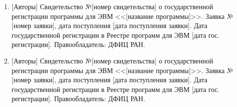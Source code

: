 \begin{enumerate}

    \item
    {[Авторы]} Свидетельство №[номер свидетельства] о государственной регистрации программы для ЭВМ <<[название программы]>>. Заявка №[номер заявки], дата поступления [дата поступления заявки]. Дата государственной регистрации в Реестре программ для ЭВМ [дата гос. регистрации]. Правообладатель: ДФИЦ РАН.

    \item
    {[Авторы]} Свидетельство №[номер свидетельства] о государственной регистрации программы для ЭВМ <<[название программы]>>. Заявка №[номер заявки], дата поступления [дата поступления заявки]. Дата государственной регистрации в Реестре программ для ЭВМ [дата гос. регистрации]. Правообладатель: ДФИЦ РАН.

\end{enumerate}

